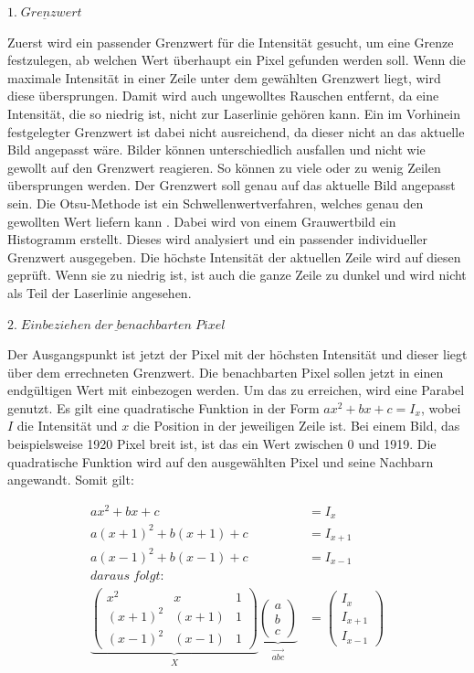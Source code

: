 	$\underline{1. \; Grenzwert}$
	
	Zuerst wird ein passender Grenzwert für die Intensität gesucht, um eine Grenze festzulegen, ab welchen Wert überhaupt ein Pixel gefunden werden soll. Wenn die maximale Intensität in einer Zeile unter dem gewählten Grenzwert liegt, wird diese übersprungen. Damit wird auch ungewolltes Rauschen entfernt, da eine Intensität, die so niedrig ist, nicht zur Laserlinie gehören kann. Ein im Vorhinein festgelegter Grenzwert ist dabei nicht ausreichend, da dieser nicht an das aktuelle Bild angepasst wäre. Bilder können unterschiedlich ausfallen und nicht wie gewollt auf den Grenzwert reagieren. So können zu viele oder zu wenig Zeilen übersprungen werden. Der Grenzwert soll genau auf das aktuelle Bild angepasst sein. Die Otsu-Methode ist ein Schwellenwertverfahren, welches genau den gewollten Wert liefern kann \citep[vgl.][]{otsu_tlreshold_nodate}. Dabei wird von einem Grauwertbild ein Histogramm erstellt. Dieses wird analysiert und ein passender individueller Grenzwert ausgegeben. Die höchste Intensität der aktuellen Zeile wird auf diesen geprüft. Wenn sie zu niedrig ist, ist auch die ganze Zeile zu dunkel und wird nicht als Teil der Laserlinie angesehen.
	
	$\underline{2. \; Einbeziehen \; der \; benachbarten \; Pixel}$
	
	Der Ausgangspunkt ist jetzt der Pixel mit der höchsten Intensität und dieser liegt über dem errechneten Grenzwert. Die benachbarten Pixel sollen jetzt in einen endgültigen Wert mit einbezogen werden. Um das zu erreichen, wird eine Parabel genutzt. Es gilt eine quadratische Funktion in der Form \( ax^2 + bx + c = I_x \), wobei \( I \) die Intensität und \( x \) die Position in der jeweiligen Zeile ist. Bei einem Bild, das beispielsweise 1920 Pixel breit ist, ist das ein Wert zwischen 0 und 1919. Die quadratische Funktion wird auf den ausgewählten Pixel und seine Nachbarn angewandt. Somit gilt:
	
	\begin{equation}
	\begin{aligned}
	ax^2 + bx + c &= I_x \\
	a(x+1)^2 + b(x+1) + c &= I_{x+1} \\
	a(x-1)^2 + b(x-1) + c &= I_{x-1} \\
	daraus \; folgt: \\
	\underbrace{\begin{pmatrix}
		x^2 & x & 1 \\
		(x+1)^2 & (x+1) & 1 \\
		(x-1)^2 & (x-1) & 1 
		\end{pmatrix}}_{\substack{X}} \underbrace{ \begin{pmatrix}
		a \\
		b \\
		c
		\end{pmatrix}}_{\substack{\vec{abc}}} &= \begin{pmatrix}
	I_x \\
	I_{x+1} \\
	I_{x-1}
	\end{pmatrix}
	\end{aligned}
	\label{eq:subpixel_x}
	\end{equation}
	
